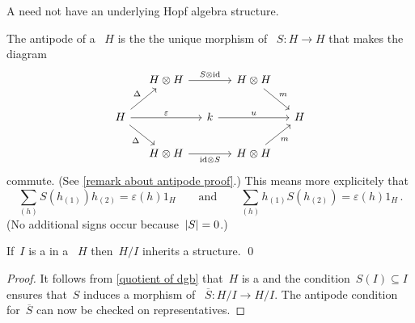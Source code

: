 \documentclass[a4paper,10pt,headings=standardclasses]{scrartcl}
\begin{document}
\begin{warning}
  A {\dgh} need not have an underlying Hopf algebra structure.
\end{warning}

\begin{remark}
  \label{remark about antipode}
  The antipode of a {\dgh}~$H$ is the the unique morphism of {\dgvs}~$S \colon H \to H$ that makes the diagram
  \begin{equation}
    \label{antipode diagram}
    \begin{tikzcd}[column sep = small]
      {}
      &
      H \tensor H
      \arrow{rr}[above]{S \tensor {\id}}
      &
      {}
      &
      H \tensor H
      \arrow{dr}[above right]{m}
      &
      {}
      \\
      H
      \arrow{ur}[above left]{\Delta}
      \arrow{rr}[above]{\varepsilon}
      \arrow{dr}[below left]{\Delta}
      &
      {}
      &
      k
      \arrow{rr}[above]{u}
      &
      {}
      &
      H
      \\
      {}
      &
      H \tensor H
      \arrow{rr}[below]{{\id} \tensor S}
      &
      {}
      &
      H \tensor H
      \arrow{ur}[below right]{m}
      &
      {}
    \end{tikzcd}
  \end{equation}
  commute.
  (See \cref{remark about antipode proof}.)
  This means more explicitely that
  \[
    \sum_{(h)} S(h_{(1)}) h_{(2)}
    =
    \varepsilon(h) 1_H
    \qquad\text{and}\qquad
    \sum_{(h)} h_{(1)} S(h_{(2)})
    =
    \varepsilon(h) 1_H  \,.
  \]
  (No additional signs occur because~$\lvert S\rvert = 0$.)
\end{remark}

\begin{lemma}
  If~$I$ is a {\dghi} in a {\dgh}~$H$ then~$H/I$ inherits a {\dgh} structure.
  \qed
\end{lemma}

\begin{proof}
  It follows from \cref{quotient of dgb} that~$H$ is a {\dgb} and the condition~$S(I) \subseteq I$ ensures that~$S$ induces a morphism of {\dgvs}~$\overline{S} \colon H/I \to H/I$.
  The antipode condition for~$\overline{S}$ can now be checked on representatives.
\end{proof}
\end{document}
